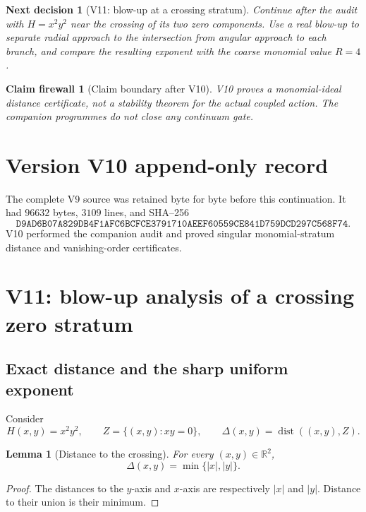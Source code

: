 \documentclass[11pt]{article}
\newtheorem{lemma}[theorem]{Lemma}
\newtheorem{firewall}[theorem]{Claim firewall}
\newtheorem{decision}[theorem]{Next decision}
\theoremstyle{remark}
\begin{document}
\begin{decision}[V11: blow-up at a crossing stratum]
\label{dec:v17v10-next}
Continue after the audit with
\(H=x^2y^2\) near the crossing of its two zero components.  Use a
real blow-up to separate radial approach to the intersection from
angular approach to each branch, and compare the resulting exponent
with the coarse monomial value \(R=4\).
\end{decision}

\begin{firewall}[Claim boundary after V10]
\label{fire:v17v10}
V10 proves a monomial-ideal distance certificate, not a stability
theorem for the actual coupled action.  The companion programmes do
not close any continuum gate.
\end{firewall}

\section*{Version V10 append-only record}
The complete V9 source was retained byte for byte before this
continuation.  It had \(96632\) bytes, \(3109\) lines, and SHA--256
\[
 \texttt{D9AD6B07A829DB4F1AFC6BCFCE3791710AEEF60559CE841D759DCD297C568F74}.
\]
V10 performed the companion audit and proved singular
monomial-stratum distance and vanishing-order certificates.


\section{V11: blow-up analysis of a crossing zero stratum}
\label{sec:v17v11}

\subsection{Exact distance and the sharp uniform exponent}

Consider
\[
 H(x,y)=x^2y^2,\qquad
 Z=\{(x,y):xy=0\},
 \qquad
 \Delta(x,y)=\operatorname{dist}((x,y),Z).          \tag{11.1}
\]

\begin{lemma}[Distance to the crossing]
\label{lem:v17v11-distance}
For every \((x,y)\in\mathbb R^2\),
\[
 \Delta(x,y)=\min\{|x|,|y|\}.                      \tag{11.2}
\]
\end{lemma}

\begin{proof}
The distances to the \(y\)-axis and \(x\)-axis are respectively
\(|x|\) and \(|y|\).  Distance to their union is their minimum.
\end{proof}
\end{document}
